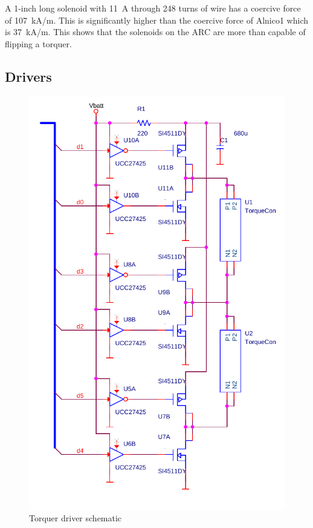A 1-inch long solenoid with 11~A through 248 turns of wire has a coercive force of 107~kA/m. This is significantly higher than the coercive force of Alnico1 which is 37~kA/m\cite{AlnicoProp}. This shows that the solenoids on the \ac{ARC} are more than capable of flipping a torquer.

\subsection{Drivers}

\begin{figure}[htb!]
    \centering
    \includegraphics[height=0.5\textheight]{Figures/driverSchematic}
    \caption{Torquer driver schematic}
    \label{fig:drive}
\end{figure}

